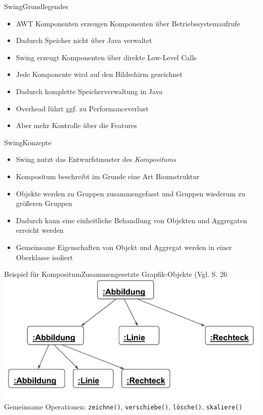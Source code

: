\begin{frame}{Swing}{Grundlegendes}
	\begin{itemize}
		\item AWT Komponenten erzeugen Komponenten über Betriebssystemaufrufe
		\item Dadurch Speicher nicht über Java verwaltet
		\item Swing erzeugt Komponenten über direkte Low-Level Calls
		\item Jede Komponente wird auf den Bildschirm gezeichnet
		\item Dadurch komplette Speicherverwaltung in Java
		\item Overhead führt ggf. zu Performanceverlust
		\item Aber mehr Kontrolle über die Features
	\end{itemize}
\end{frame}

\begin{frame}{Swing}{Konzepte}
	\begin{itemize}
		\item Swing nutzt das Entwurfstmuster des \textit{Kompositums}
		\item Kompositum beschreibt im Grunde eine Art Baumstruktur
		\item Objekte werden zu Gruppen zusammengefasst und Gruppen wiederum zu größeren Gruppen
		\item Dadurch kann eine einheitliche Behandlung von Objekten und Aggregaten erreicht werden
		\item Gemeinsame Eigenschaften von Objekt und Aggregat werden in einer Oberklasse isoliert
	\end{itemize}
\end{frame}

\begin{frame}{Beispiel für Kompositum}{Zusammengesetzte Grapfik-Objekte (Vgl. \cite{judt2017} S. 26}
	\includegraphics*[width=.8\textwidth]{graph/compositum_example}
	Gemeinsame Operationen: \texttt{zeichne()}, \texttt{verschiebe()}, \texttt{lösche()}, \texttt{skaliere()}
\end{frame}

